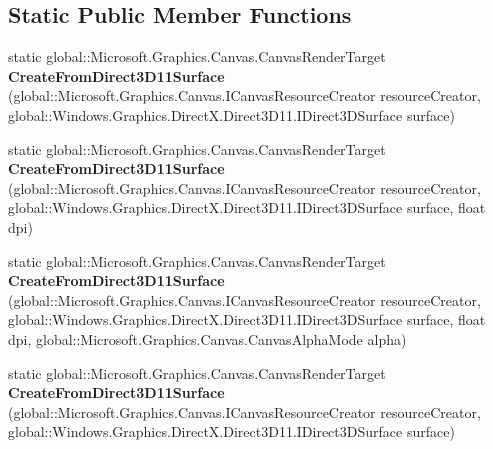 \subsection*{Static Public Member Functions}
\begin{DoxyCompactItemize}
\item 
\mbox{\label{class_microsoft_1_1_graphics_1_1_canvas_1_1_canvas_render_target_a6214c61bb128a65a41a783600e00335a}} 
static global\+::\+Microsoft.\+Graphics.\+Canvas.\+Canvas\+Render\+Target {\bfseries Create\+From\+Direct3\+D11\+Surface} (global\+::\+Microsoft.\+Graphics.\+Canvas.\+I\+Canvas\+Resource\+Creator resource\+Creator, global\+::\+Windows.\+Graphics.\+Direct\+X.\+Direct3\+D11.\+I\+Direct3\+D\+Surface surface)
\item 
\mbox{\label{class_microsoft_1_1_graphics_1_1_canvas_1_1_canvas_render_target_a3aab21df283c755cb1bc43211916da41}} 
static global\+::\+Microsoft.\+Graphics.\+Canvas.\+Canvas\+Render\+Target {\bfseries Create\+From\+Direct3\+D11\+Surface} (global\+::\+Microsoft.\+Graphics.\+Canvas.\+I\+Canvas\+Resource\+Creator resource\+Creator, global\+::\+Windows.\+Graphics.\+Direct\+X.\+Direct3\+D11.\+I\+Direct3\+D\+Surface surface, float dpi)
\item 
\mbox{\label{class_microsoft_1_1_graphics_1_1_canvas_1_1_canvas_render_target_aaa9628136a19a0737f5229fbb9c84e55}} 
static global\+::\+Microsoft.\+Graphics.\+Canvas.\+Canvas\+Render\+Target {\bfseries Create\+From\+Direct3\+D11\+Surface} (global\+::\+Microsoft.\+Graphics.\+Canvas.\+I\+Canvas\+Resource\+Creator resource\+Creator, global\+::\+Windows.\+Graphics.\+Direct\+X.\+Direct3\+D11.\+I\+Direct3\+D\+Surface surface, float dpi, global\+::\+Microsoft.\+Graphics.\+Canvas.\+Canvas\+Alpha\+Mode alpha)
\item 
\mbox{\label{class_microsoft_1_1_graphics_1_1_canvas_1_1_canvas_render_target_a6214c61bb128a65a41a783600e00335a}} 
static global\+::\+Microsoft.\+Graphics.\+Canvas.\+Canvas\+Render\+Target {\bfseries Create\+From\+Direct3\+D11\+Surface} (global\+::\+Microsoft.\+Graphics.\+Canvas.\+I\+Canvas\+Resource\+Creator resource\+Creator, global\+::\+Windows.\+Graphics.\+Direct\+X.\+Direct3\+D11.\+I\+Direct3\+D\+Surface surface)

\end{DoxyCompactItemize}
